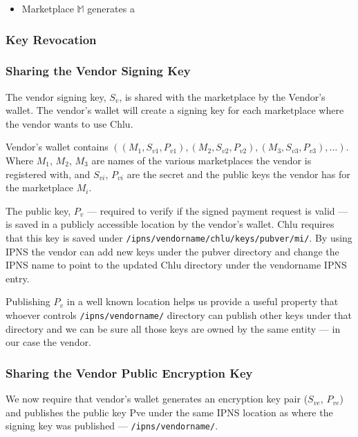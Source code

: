 \documentclass[a4paper]{article}
\begin{document}
\begin{itemize}
\item Marketplace $\mathbb{M}$ generates a 
\end{itemize}

\subsubsection{Key Revocation}\label{sec:key-revocation}


\subsubsection{Sharing the Vendor Signing Key}

The vendor signing key, $S_v$, is shared with the marketplace by the
Vendor's wallet. The vendor's wallet will create a signing key for
each marketplace where the vendor wants to use Chlu.

Vendor's wallet contains $((M_1, S_{v1}, P_{v1}), (M_2, S_{v2},
P_{v2}), (M_3,S_{v3},P_{v3}), \ldots)$. Where $M_1$, $M_2$, $M_3$ are
names of the various marketplaces the vendor is registered with, and
$S_{vi}$, $P_{vi}$ are the secret and the public keys the vendor has
for the marketplace $M_i$.

The public key, $P_v$ --- required to verify if the signed payment
request is valid --- is saved in a publicly accessible location by the
vendor's wallet. Chlu requires that this key is saved under
\texttt{/ipns/vendorname/chlu/keys/pubver/mi/}. By using IPNS the vendor
can add new keys under the pubver directory and change the IPNS name
to point to the updated Chlu directory under the vendorname IPNS
entry.

Publishing $P_v$ in a well known location helps us provide a useful
property that whoever controls \texttt{/ipns/vendorname/} directory can
publish other keys under that directory and we can be sure all those
keys are owned by the same entity --- in our case the vendor.

\subsubsection{Sharing the Vendor Public Encryption Key}

We now require that vendor's wallet generates an encryption key pair
($S_{ve}$, $P_{ve}$) and publishes the public key Pve under the same
IPNS location as where the signing key was published ---
\texttt{/ipns/vendorname/}.
\end{document}
